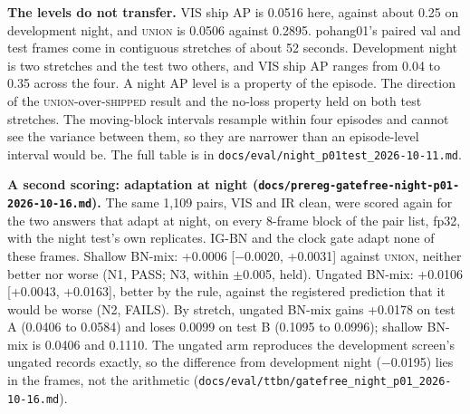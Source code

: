 \documentclass[journal,onecolumn]{IEEEtran}
\begin{document}
\textbf{The levels do not transfer.} VIS ship AP is 0.0516 here, against about 0.25 on development night, and \textsc{union} is 0.0506 against 0.2895. pohang01's paired val and test frames come in contiguous stretches of about 52 seconds. Development night is two stretches and the test two others, and VIS ship AP ranges from 0.04 to 0.35 across the four. A night AP level is a property of the episode. The direction of the \textsc{union}-over-\textsc{shipped} result and the no-loss property held on both test stretches. The moving-block intervals resample within four episodes and cannot see the variance between them, so they are narrower than an episode-level interval would be. The full table is in \texttt{docs/\allowbreak{}eval/\allowbreak{}night\_\allowbreak{}p01test\_\allowbreak{}2026-\allowbreak{}10-\allowbreak{}11.md}.

\textbf{A second scoring: adaptation at night (\texttt{docs/\allowbreak{}prereg-\allowbreak{}gatefree-\allowbreak{}night-\allowbreak{}p01-\allowbreak{}2026-\allowbreak{}10-\allowbreak{}16.md}).} The same 1,109 pairs, VIS and IR clean, were scored again for the two answers that adapt at night, on every 8-frame block of the pair list, fp32, with the night test's own replicates. \mbox{IG-BN} and the clock gate adapt none of these frames. Shallow BN-mix: +0.0006 [$-$0.0020, +0.0031] against \textsc{union}, neither better nor worse (N1, PASS; N3, within $\pm$0.005, held). Ungated BN-mix: +0.0106 [+0.0043, +0.0163], better by the rule, against the registered prediction that it would be worse (N2, FAILS). By stretch, ungated BN-mix gains +0.0178 on test A (0.0406 to 0.0584) and loses 0.0099 on test B (0.1095 to 0.0996); shallow BN-mix is 0.0406 and 0.1110. The ungated arm reproduces the development screen's ungated records exactly, so the difference from development night ($-$0.0195) lies in the frames, not the arithmetic (\texttt{docs/\allowbreak{}eval/\allowbreak{}ttbn/\allowbreak{}gatefree\_\allowbreak{}night\_\allowbreak{}p01\_\allowbreak{}2026-\allowbreak{}10-\allowbreak{}16.md}).
\end{document}
